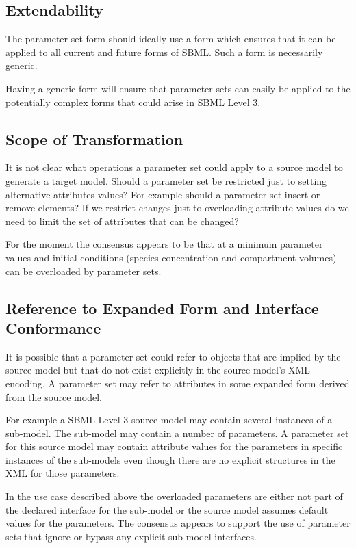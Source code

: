 \documentclass[10pt,twocolumntoc]{cekarticle}
\begin{document}
\subsection{Extendability}
\label{sec:extendability}
The parameter set form should ideally use a form which ensures that it can be applied to
all current and future forms of SBML.  Such a form is necessarily generic.

Having a generic form will ensure that parameter sets can easily be applied to the potentially
complex forms that could arise in SBML Level 3.

\subsection{Scope of Transformation}

It is not clear what operations a parameter set could apply to a source model to generate a
target model.  Should a parameter set be restricted just to setting alternative attributes
values? For example should a parameter set insert or remove elements?  If we restrict changes
just to overloading attribute values do we need to limit the set of attributes that can be
changed?

For the moment the consensus appears to be that at a minimum parameter values and initial
conditions (species concentration and compartment volumes) can be overloaded by parameter sets.

\subsection{Reference to Expanded Form and Interface Conformance}
\label{sec:implied-structures}

It is possible that a parameter set could refer to objects that are implied by the source
model but that do not exist explicitly in the source model's XML encoding.  A parameter set
may refer to attributes in some expanded form derived from the source model.

For example a
SBML Level 3 source model may contain several instances of a sub-model.  The sub-model may
contain a number of parameters.  A parameter set for this source model may contain attribute
values for the parameters in specific instances of the sub-models even though there are no
explicit structures in the XML for those parameters.

In the use case described above the overloaded parameters are either not part of the declared
interface for the sub-model or the source model assumes default values for the parameters.  The
consensus appears to support the use of parameter sets that ignore or bypass any explicit
sub-model interfaces.
\end{document}
